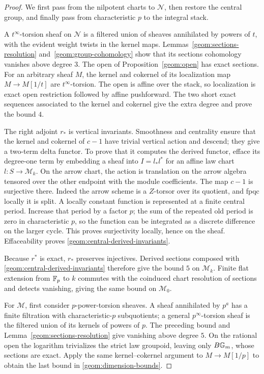 \begin{proof}
We first pass from the nilpotent charts to $\mathcal N$, then restore
the central group, and finally pass from characteristic $p$ to the
integral stack.

A $t^\infty$-torsion sheaf on $\mathcal N$ is a filtered union of
sheaves annihilated by powers of $t$, with the evident weight twists
in the kernel maps.  Lemmas~\ref{geom:sections-resolution}
and~\ref{geom:group-cohomology} show that its sections cohomology
vanishes above degree $3$.  The open of
Proposition~\ref{geom:open} has exact sections.  For an arbitrary
sheaf $M$, the kernel and cokernel of its localization map
$M\to M[1/t]$ are $t^\infty$-torsion.  The open is affine over the
stack, so localization is exact open restriction followed by affine
pushforward.  The two short exact sequences associated to the kernel
and cokernel give the extra degree and prove the bound $4$.

The right adjoint $r_*$ is vertical invariants.  Smoothness and
centrality ensure that the kernel and cokernel of $c-1$ have trivial
vertical action and descend; they give a two-term delta functor.
To prove that it computes the derived functor, efface its degree-one
term by embedding a sheaf into $I=l_*l^*$ for an affine law chart
$l:S\to\mathcal M_k$.  On the arrow chart, the action is translation
on the arrow algebra tensored over the other endpoint with the
module coefficients.  The map $c-1$ is surjective there.  Indeed the
arrow scheme is a $Z$-torsor over its quotient, and fpqc locally it
is split.  A locally constant function is represented at a finite
central period.  Increase that period by a factor $p$; the sum of
the repeated old period is zero in characteristic $p$, so the
function can be integrated as a discrete difference on the larger
cycle.  This proves surjectivity locally, hence on the sheaf.
Effaceability proves \eqref{geom:central-derived-invariants}.

Because $r^*$ is exact, $r_*$ preserves injectives.  Derived sections
composed with \eqref{geom:central-derived-invariants} therefore give
the bound $5$ on $\mathcal M_k$.  Finite flat extension from $\mathbb F_p$
to $k$ commutes with the coinduced chart resolution of sections and
detects vanishing, giving the same bound on $\mathcal M_0$.

For $\mathcal M$, first consider $p$-power-torsion sheaves.  A sheaf
annihilated by $p^a$ has a finite filtration with characteristic-$p$
subquotients; a general $p^\infty$-torsion sheaf is the filtered union
of its kernels of powers of $p$.  The preceding bound and
Lemma~\ref{geom:sections-resolution} give vanishing above degree
$5$.  On the rational open the logarithm trivializes the strict law
groupoid, leaving only $B\mathbb G_m$, whose sections are exact.  Apply the
same kernel--cokernel argument to $M\to M[1/p]$ to obtain the last
bound in \eqref{geom:dimension-bounds}.
\end{proof}


